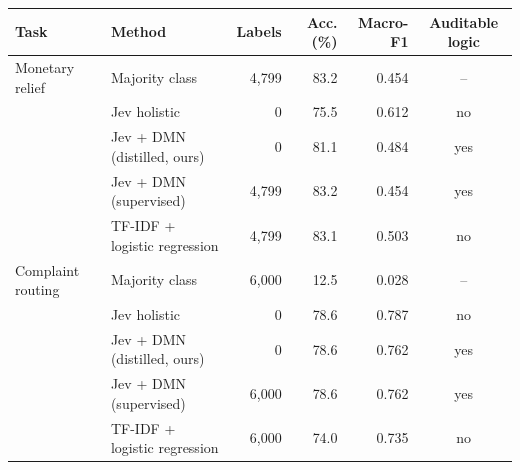 \begin{tabular}{@{}llrrrc@{}}
\toprule
Task & Method & Labels & Acc. (\%) & Macro-F1 & Auditable logic \\
\midrule
Monetary relief & Majority class & 4,799 & 83.2 & 0.454 & -- \\
 & Jev holistic & 0 & 75.5 & 0.612 & no \\
 & Jev + DMN (distilled, ours) & 0 & 81.1 & 0.484 & yes \\
 & Jev + DMN (supervised) & 4,799 & 83.2 & 0.454 & yes \\
 & TF-IDF + logistic regression & 4,799 & 83.1 & 0.503 & no \\
\midrule
Complaint routing & Majority class & 6,000 & 12.5 & 0.028 & -- \\
 & Jev holistic & 0 & 78.6 & 0.787 & no \\
 & Jev + DMN (distilled, ours) & 0 & 78.6 & 0.762 & yes \\
 & Jev + DMN (supervised) & 6,000 & 78.6 & 0.762 & yes \\
 & TF-IDF + logistic regression & 6,000 & 74.0 & 0.735 & no \\
\bottomrule
\end{tabular}
